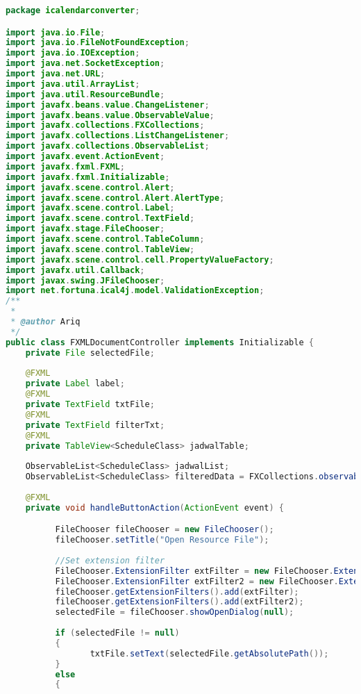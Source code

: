 \begin{lstlisting}[language=Java,basicstyle=\tiny,caption=FXMLDocumentController.java,label=lst:FXMLDocumentController]
package icalendarconverter;

import java.io.File;
import java.io.FileNotFoundException;
import java.io.IOException;
import java.net.SocketException;
import java.net.URL;
import java.util.ArrayList;
import java.util.ResourceBundle;
import javafx.beans.value.ChangeListener;
import javafx.beans.value.ObservableValue;
import javafx.collections.FXCollections;
import javafx.collections.ListChangeListener;
import javafx.collections.ObservableList;
import javafx.event.ActionEvent;
import javafx.fxml.FXML;
import javafx.fxml.Initializable;
import javafx.scene.control.Alert;
import javafx.scene.control.Alert.AlertType;
import javafx.scene.control.Label;
import javafx.scene.control.TextField;
import javafx.stage.FileChooser;
import javafx.scene.control.TableColumn;
import javafx.scene.control.TableView;
import javafx.scene.control.cell.PropertyValueFactory;
import javafx.util.Callback;
import javax.swing.JFileChooser;
import net.fortuna.ical4j.model.ValidationException;
/**
 *
 * @author Ariq
 */
public class FXMLDocumentController implements Initializable {
    private File selectedFile;
     
    @FXML
    private Label label;
    @FXML
    private TextField txtFile;
    @FXML
    private TextField filterTxt;
    @FXML
    private TableView<ScheduleClass> jadwalTable;
    
    ObservableList<ScheduleClass> jadwalList;
    ObservableList<ScheduleClass> filteredData = FXCollections.observableArrayList();
    
    @FXML
    private void handleButtonAction(ActionEvent event) {

          FileChooser fileChooser = new FileChooser();
          fileChooser.setTitle("Open Resource File");
          
          //Set extension filter
          FileChooser.ExtensionFilter extFilter = new FileChooser.ExtensionFilter("Excel files (*.xlsx)", "*.xlsx");
          FileChooser.ExtensionFilter extFilter2 = new FileChooser.ExtensionFilter("Excel files (*.xls)", "*.xls");
          fileChooser.getExtensionFilters().add(extFilter);
          fileChooser.getExtensionFilters().add(extFilter2);
          selectedFile = fileChooser.showOpenDialog(null);
         
          if (selectedFile != null)
          {
                 txtFile.setText(selectedFile.getAbsolutePath());
          }
          else 
          {
             

\end{lstlisting}
